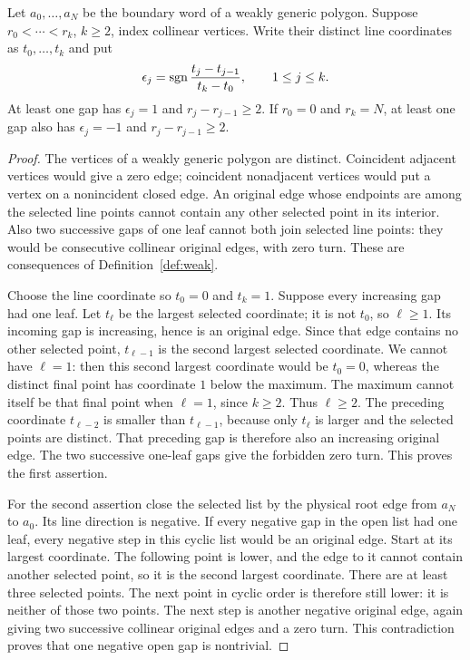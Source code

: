 \begin{lemma}\label{pf:line-gap}
Let $a_0,\ldots,a_N$ be the boundary word of a weakly generic
polygon. Suppose $r_0<\cdots<r_k$, $k\geq2$, index collinear
vertices. Write their distinct line coordinates as $t_0,\ldots,t_k$
and put
\begin{equation}\label{pf:gap-directions}
 \epsilon_j=\operatorname{sgn}\frac{t_j-t_{j-1}}{t_k-t_0},\qquad 1\leq j\leq k.
\end{equation}
At least one gap has $\epsilon_j=1$ and $r_j-r_{j-1}\geq2$.
If $r_0=0$ and $r_k=N$, at least one gap also has
$\epsilon_j=-1$ and $r_j-r_{j-1}\geq2$.
\end{lemma}
\begin{proof}
The vertices of a weakly generic polygon are distinct. Coincident
adjacent vertices would give a zero edge; coincident nonadjacent
vertices would put a vertex on a nonincident closed edge.
An original edge whose endpoints are among the selected line points
cannot contain any other selected point in its interior. Also two
successive gaps of one leaf cannot both join selected line points:
they would be consecutive collinear original edges, with zero turn.
These are consequences of Definition~\ref{def:weak}.

Choose the line coordinate so $t_0=0$ and $t_k=1$. Suppose every
increasing gap had one leaf. Let $t_\ell$ be the largest selected
coordinate; it is not $t_0$, so $\ell\geq1$. Its incoming gap is
increasing, hence is an original edge. Since that edge contains no
other selected point, $t_{\ell-1}$ is the second largest selected
coordinate. We cannot have $\ell=1$: then this second largest
coordinate would be $t_0=0$, whereas the distinct final point has
coordinate $1$ below the maximum. The maximum cannot itself be
that final point when $\ell=1$, since $k\geq2$.
Thus $\ell\geq2$. The preceding coordinate $t_{\ell-2}$ is smaller
than $t_{\ell-1}$, because only $t_\ell$ is larger and the selected
points are distinct. That preceding gap is therefore also an
increasing original edge. The two successive one-leaf gaps give
the forbidden zero turn. This proves the first assertion.

For the second assertion close the selected list by the physical
root edge from $a_N$ to $a_0$. Its line direction is negative.
If every negative gap in the open list had one leaf, every negative
step in this cyclic list would be an original edge. Start at its
largest coordinate. The following point is lower, and the edge to
it cannot contain another selected point, so it is the second largest
coordinate. There are at least three selected points. The next point
in cyclic order is therefore still lower: it is neither of those two
points. The next step is another negative original edge, again
giving two successive collinear original edges and a zero turn.
This contradiction proves that one negative open gap is nontrivial.
\end{proof}


